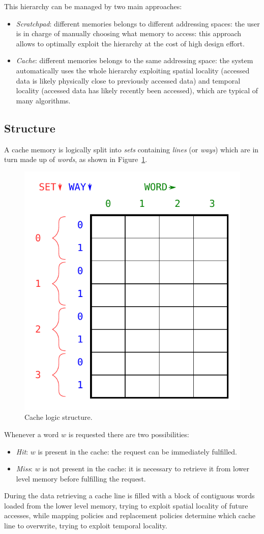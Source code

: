 \documentclass[11pt,a4paper]{memoir}
\begin{document}
This hierarchy can be managed by two main approaches:
\begin{itemize}
	\item \emph{Scratchpad}: different memories belongs to different addressing
		spaces: the user is in charge of manually choosing what memory
		to access: this approach allows to optimally exploit the
		hierarchy at the cost of high design effort.
	\item \emph{Cache}: different memories belongs to the same addressing
		space: the system automatically uses the whole hierarchy
		exploiting spatial locality (accessed data is likely physically
		close to previously accessed data) and temporal locality
		(accessed data has likely recently been accessed), which are
		typical of many algorithms.
\end{itemize}

\subsection{Structure}
A cache memory is logically split into \emph{sets} containing \emph{lines} (or
\emph{ways}) which are in turn made up of \emph{words}, as shown in
Figure~\ref{fig:cache_logic_structure}.

\begin{figure}
	\centering
	\includegraphics[width=.5\textwidth]{cache_logic_structure}
	\caption{Cache logic structure.}
	\label{fig:cache_logic_structure}
\end{figure}

Whenever a word $w$ is requested there are two possibilities:
\begin{itemize}
	\item \emph{Hit}: $w$ is present in the cache: the request can be
		immediately fulfilled.
	\item \emph{Miss}: $w$ is not present in the cache: it is necessary to
		retrieve it from lower level memory before fulfilling the request.
\end{itemize}
During the data retrieving a cache line is filled with a block of contiguous
words loaded from the lower level memory, trying to exploit spatial locality of
future accesses, while mapping policies and replacement policies determine which
cache line to overwrite, trying to exploit temporal locality.
\end{document}
